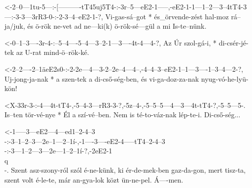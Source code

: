   {<-2--0---1tu-5---:-[----------tT45uj5T4-:-3r--5---eE2-1-----,-eE2-1-1---1--2---3--4tT4-3---:-3-3---3rR3-0-:-2-3--4--eE2-1-?,}
  {  Vi-gas-sá--got * és_örvende-zést        hal-moz rá--ja/juk, és  ö-rök ne-vet ad ne---ki(k) ö-rök-sé---gül a mi Is-te--nünk.}

  {<-0--1--3----3r-4-:--5--4----5--4---3--2-1---3----4t-4---4-?,}
  {  Az Úr szol-gá-i, * di-csér-jé-tek az U-rat mind-ö--rök-ké.}

  {<-2--2----2--1äeE2s0-:-2-2e---4---3-2--2e--4---4--,-4--4--3--eE2-1--1---3----1--3--4---2-?,}
  {  Uj-jong-ja-nak     * a szen-tek a di-cső-ség-ben, és vi-ga-doz-za-nak nyug-vó-he-lyü-kön!}

  {<X-33r-3-:-4---4t-tT4-,-5--4-3---rR3-3-?,-5z--4-,-5--5--5---4---3---4t-tT4-?,-5--5---5-.}
  {   Is--ten tör-vé-nye * Él a szí-vé--ben. Nem is  té-to-váz-nak lép-te-i. Di-cső-ség...}





  {<-1-----3---eE2---4---ed1--2-4--3\\-:-3--1--2--3---2e--1---2--1í-,-1----3----eE2-4-----tT4--2-4--3\\-:-3---1--2---3---2e---1--2--1í-?,-2eE2-1\\q\\-.}
  {  Szent asz-szony-ról szól é-ne-künk, ki ér-de-mek-ben gaz-da-gon, mert tisz-ta, szent volt é-le-te,   már an-gya-lok közt ün-ne-pel.  Á----men.}


